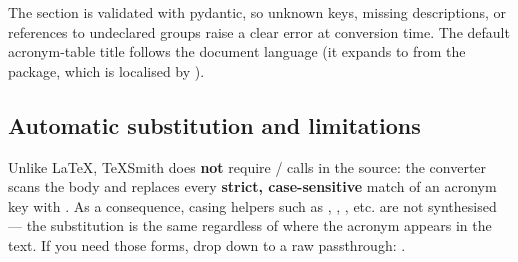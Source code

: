\documentclass[a4paper,twoside]{article}
\begin{document}
The section is validated with pydantic, so unknown keys, missing descriptions,
or references to undeclared groups raise a clear error at conversion time. The
default acronym-table title follows the document language (it expands to
 from the  package, which is localised by ).
\subsection{Automatic substitution and limitations}
Unlike \LaTeX{}, TeXSmith does \textbf{not} require  /  calls in the
source: the converter scans the body and replaces every \textbf{strict, case-sensitive}
match of an acronym key with . As a consequence, casing helpers
such as , , , etc. are not synthesised --- the substitution
is the same regardless of where the acronym appears in the text. If you need
those forms, drop down to a raw passthrough:
.

\printglossary[type=\acronymtype]
\end{document}
